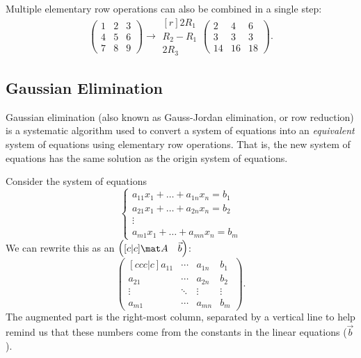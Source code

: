 \begin{example}
    Multiple elementary row operations can also be combined in a single step:
    \[\begin{pmatrix}1 & 2 & 3 \\ 4 & 5 & 6 \\ 7 & 8 & 9\end{pmatrix} \rightarrow \begin{matrix}[r] \scriptstyle 2R_1 \\ \scriptstyle R_2 - R_1 \\ \scriptstyle 2R_3\end{matrix} \begin{pmatrix}2 & 4 & 6 \\ 3 & 3 & 3 \\ 14 & 16 & 18\end{pmatrix}.\]
\end{example}

\subsection{Gaussian Elimination}

Gaussian elimination (also known as Gauss-Jordan elimination, or row reduction) is a systematic algorithm used to convert a system of equations into an \emph{equivalent} system of equations using elementary row operations. That is, the new system of equations has the same solution as the origin system of equations.

Consider the system of equations \[\left\{ \begin{matrix}a_{11} x_1 + \dots + a_{1n} x_n = b_1 \\ a_{21} x_1 + \dots + a_{2n} x_n = b_2 \\ \vdots \\ a_{m1} x_1 + \dots + a_{mn} x_n = b_m \end{matrix} \right.\] We can rewrite this as an  $\begin{pmatrix}[c|c]\mat A & \vec b\end{pmatrix}$: \[\begin{pmatrix}[ccc|c] a_{11} & \cdots & a_{1n} & b_1 \\ a_{21} & \cdots & a_{2n} & b_2 \\ \vdots & \ddots & \vdots & \vdots \\ a_{m1} & \cdots & a_{mn} & b_m \end{pmatrix}.\] The augmented part is the right-most column, separated by a vertical line to help remind us that these numbers come from the constants in the linear equations ($\vec b$).

